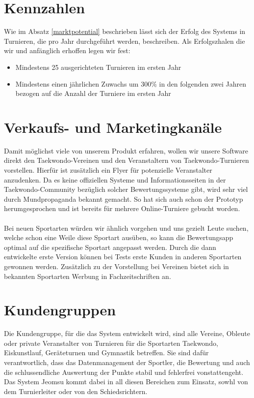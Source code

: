 \section{Kennzahlen}

Wie im Absatz \ref{marktpotential} beschrieben lässt sich der Erfolg des Systems in Turnieren, die pro Jahr
durchgeführt werden, beschreiben.
Als Erfolgszhalen die wir und anfänglich erhoffen legen wir fest:
\begin{itemize}
	\item Mindestens 25 ausgerichteten Turnieren im ersten Jahr
	\item Mindestens einen jährlichen Zuwachs um 300\% in den folgenden zwei Jahren bezogen auf die Anzahl der
	Turniere im ersten Jahr
\end{itemize}

\section{Verkaufs- und Marketingkanäle}
Damit möglichst viele von unserem Produkt erfahren, wollen wir unsere Software direkt den Taekwondo-Vereinen und
den Veranstaltern von Taekwondo-Turnieren vorstellen.
Hierfür ist zusätzlich ein Flyer für potenzielle Veranstalter anzudenken.
Da es keine offiziellen Systeme und Informationsseiten in der Taekwondo-Community bezüglich solcher Bewertungssysteme
gibt, wird sehr viel durch Mundpropaganda bekannt gemacht.
So hat sich auch schon der Prototyp herumgesprochen und ist bereits für mehrere Online-Turniere gebucht worden.
\\\\
Bei neuen Sportarten würden wir ähnlich vorgehen und uns gezielt Leute suchen, welche schon eine Weile diese Sportart
	ausüben, so kann die Bewertungsapp optimal auf die spezifische Sportart angepasst werden.
Durch die dann entwickelte erste Version können bei Tests erste Kunden in anderen Sportarten gewonnen werden.
Zusätzlich zu der Vorstellung bei Vereinen bietet sich in bekannten Sportarten Werbung in Fachzeitschriften an.

\section{Kundengruppen}
Die Kundengruppe, für die das System entwickelt wird, sind alle Vereine, Obleute oder private Veranstalter von
Turnieren für die Sportarten Taekwondo, Eiskunstlauf, Geräteturnen und Gymnastik betreffen.
Sie sind dafür verantwortlich, dass das Datenmanagement der Sportler, die Bewertung und auch die schlussendliche
Auswertung der Punkte stabil und fehlerfrei vonstattengeht.
Das System Jeomsu kommt dabei in all diesen Bereichen zum Einsatz, sowhl von dem Turnierleiter oder von den
Schiedsrichtern.


